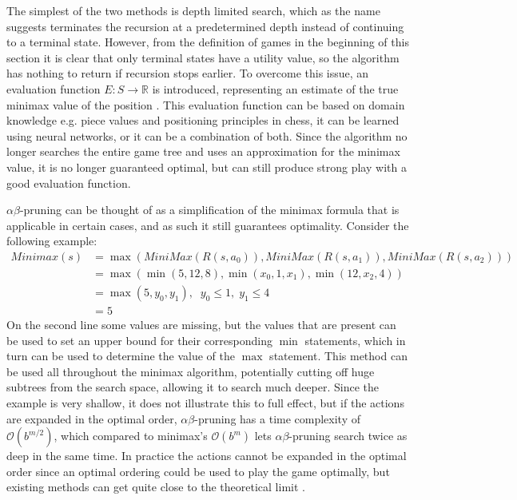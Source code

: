 The simplest of the two methods is depth limited search, which
as the name suggests terminates the recursion at a predetermined
depth instead of continuing to a terminal state. However, from 
the definition of games in the beginning of this section it is
clear that only terminal states have a utility value, so the
algorithm has nothing to return if recursion stops earlier. To
overcome this issue, an evaluation function 
$E: S \rightarrow \mathbb{R}$ is introduced, representing an
estimate of the true minimax value of the position \revise. 
This evaluation function can be based on domain knowledge e.g.
piece values and positioning principles in chess, it can be
learned using neural networks, or it can be a combination of both.
Since the algorithm no longer searches the entire game tree and
uses an approximation for the minimax value, it is no longer
guaranteed optimal, but can still produce strong play with a good
evaluation function.

$\alpha\beta$-pruning can be thought of as a simplification of
the minimax formula that is applicable in certain cases, and
as such it still guarantees optimality. Consider the following
example:
\begin{align*}
    Minimax(s) &= \max(MiniMax(R(s, a_0)), MiniMax(R(s, a_1)), 
    MiniMax(R(s, a_2))) \\
    &= \max(\min(5, 12, 8), \min(x_0, 1, x_1), \min(12, x_2, 4)) \\
    &= \max(5, y_0, y_1), \;\; y_0 \leq 1, \; y_1 \leq 4 \\
    &= 5
\end{align*}
On the second line some values are missing, but the values that are present
can be used to set an upper bound for their corresponding $\min$ statements,
which in turn can be used to determine the value of the $\max$ statement.
This method can be used all throughout the minimax algorithm, potentially
cutting off huge subtrees from the search space, allowing it to search much
deeper. Since the example is very shallow, it does not illustrate this 
to full effect, but if the actions are expanded in the optimal order, 
$\alpha\beta$-pruning has a time complexity of $\mathcal{O}(b^{m/2})$, which
compared to minimax's $\mathcal{O}(b^{m})$ lets $\alpha\beta$-pruning search
twice as deep in the same time. In practice the actions cannot be expanded
in the optimal order since an optimal ordering could be used to play the
game optimally, but existing methods can get quite close to the theoretical
limit \needcit.



